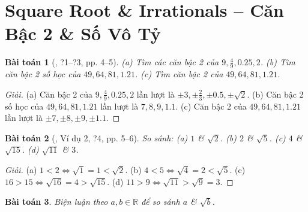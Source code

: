 \documentclass{article}
\newtheorem{baitoan}{Bài toán}
\begin{document}
\tableofcontents
\newpage


\section{Square Root \& Irrationals -- Căn Bậc 2 \& Số Vô Tỷ}

\begin{baitoan}[\cite{SGK_Toan_9_tap_1}, ?1--?3, pp. 4--5]
	(a) Tìm các căn bậc 2 của $9,\frac{4}{9},0.25,2$. (b) Tìm căn bậc 2 số học của $49,64,81,1.21$. (c) Tìm căn bậc 2 của $49,64,81,1.21$.
\end{baitoan}

\begin{proof}[Giải]
	(a) Căn bậc 2 của $9,\frac{4}{9},0.25,2$ lần lượt là $\pm3,\pm\frac{2}{3},\pm0.5,\pm\sqrt{2}$. (b) Căn bậc 2 số học của $49,64,81,1.21$ lần lượt là $7,8,9,1.1$. (c) Căn bậc 2 của $49,64,81,1.21$ lần lượt là $\pm7,\pm8,\pm9,\pm1.1$.
\end{proof}

\begin{baitoan}[\cite{SGK_Toan_9_tap_1}, Ví dụ 2, ?4, pp. 5--6]
	So sánh: (a) $1$ \& $\sqrt{2}$. (b) $2$ \& $\sqrt{5}$. (c) $4$ \& $\sqrt{15}$. (d) $\sqrt{11}$ \& $3$.
\end{baitoan}

\begin{proof}[Giải]
	(a) $1 < 2\Leftrightarrow\sqrt{1} = 1 < \sqrt{2}$. (b) $4 < 5\Leftrightarrow\sqrt{4} = 2 < \sqrt{5}$. (c) $16 > 15\Leftrightarrow\sqrt{16} = 4 > \sqrt{15}$. (d) $11 > 9\Leftrightarrow\sqrt{11} > \sqrt{9} = 3$.
\end{proof}

\begin{baitoan}
	Biện luận theo $a,b\in\mathbb{R}$ để so sánh $a$ \& $\sqrt{b}$.
\end{baitoan}
\end{document}
